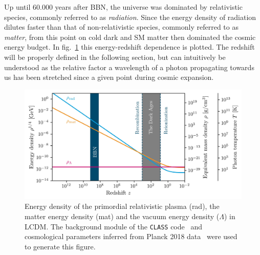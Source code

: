 Up until 60.000 years after \ac{BBN}, the universe was dominated by relativistic species, commonly referred to as \textit{radiation}. Since the energy density of radiation dilutes faster than that of non-relativistic species, commonly referred to as \textit{matter}, from this point on cold dark and \ac{SM} matter then dominated the cosmic energy budget. In fig.~\ref{fig:earlyuniversediagram} this energy-redshift dependence is plotted. The redshift will be properly defined in the following section, but can intuitively be understood as the relative factor a wavelength of a photon propagating towards us has been stretched since a given point during cosmic expansion. 

\begin{figure}[t]
	\centering
	\includegraphics[width=\textwidth]{thesisplots/early_universe_diagram/earlyuniversediagram.jpg}
	\caption{Energy density of the primordial relativistic plasma (rad), the matter energy density (mat) and the vacuum energy density ($\Lambda$) in \ac{LCDM}. The background module of the \texttt{CLASS} code~\cite{Lesgourgues:2011re} and cosmological parameters inferred from Planck 2018 data~\cite{Planck:2018vyg} were used to generate this figure.}
	\label{fig:earlyuniversediagram}
\end{figure}

